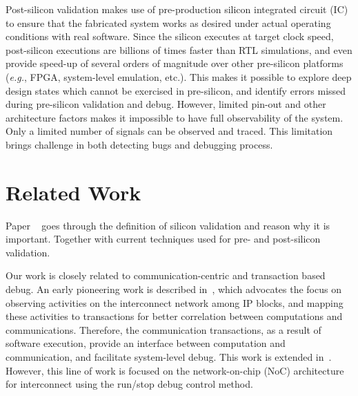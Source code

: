 \documentclass[12pt,frontmatter,copyright,thesis]{usfmanus}
\newcommand{\eg}{\mbox{{\em e.g.}}}
\begin{document}
Post-silicon validation makes use of pre-production silicon
integrated circuit (IC) to ensure that the fabricated system
works as desired under actual operating conditions with real
software.  Since the silicon executes at target clock speed,
post-silicon executions are billions of times faster than
RTL simulations, and even provide speed-up of several orders
of magnitude over other pre-silicon platforms (\eg, FPGA,
system-level emulation, etc.).  This makes it possible to
explore deep design states which cannot be exercised in
pre-silicon, and identify errors missed during pre-silicon
validation and debug.  However, limited pin-out and
other architecture factors makes it impossible to have full observability of the system.
Only a limited number of signals can be observed and traced. This limitation 
brings challenge in both detecting bugs and debugging process. 


\section{Related Work}

Paper ~\cite{validationWall} goes through the definition of
silicon validation and reason why it is important. Together with 
current techniques used for pre- and post-silicon validation.

Our work is closely related to communication-centric and
transaction based debug.  An early pioneering work is
described in~\cite{Goossens2007NOCS}, which advocates the
focus on observing activities on the interconnect network
among IP blocks, and mapping these activities to
transactions for better correlation between computations and
communications.  Therefore, the communication transactions,
as a result of software execution, provide an interface
between computation and communication, and facilitate
system-level debug.  This work is extended
in~\cite{Vermeulen2009VLSI-DAT,Goossens2009DATE}.  However,
this line of work is focused on the network-on-chip (NoC)
architecture for interconnect using the run/stop debug
control method.
\end{document}
